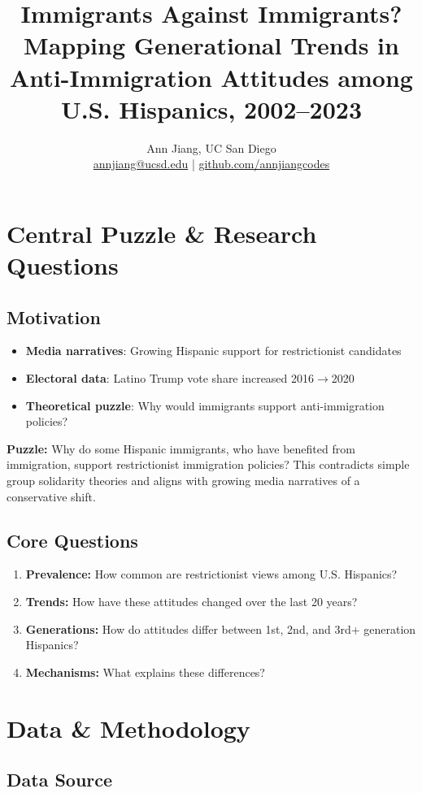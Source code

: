\documentclass[11pt,letterpaper]{article}
\title{\textbf{Immigrants Against Immigrants?}\\
\large Mapping Generational Trends in Anti-Immigration Attitudes among U.S. Hispanics, 2002--2023}
\author{Ann Jiang, UC San Diego\\
\href{mailto:annjiang@ucsd.edu}{annjiang@ucsd.edu} | \href{https://github.com/annjiangcodes}{github.com/annjiangcodes}}
\date{}
\begin{document}
\maketitle

\section{Central Puzzle \& Research Questions}

\subsection{Motivation}
\begin{itemize}
    \item \textbf{Media narratives}: Growing Hispanic support for restrictionist candidates
    \item \textbf{Electoral data}: Latino Trump vote share increased 2016$\rightarrow$2020
    \item \textbf{Theoretical puzzle}: Why would immigrants support anti-immigration policies?
\end{itemize}

\textbf{Puzzle:} Why do some Hispanic immigrants, who have benefited from immigration, support restrictionist immigration policies? This contradicts simple group solidarity theories and aligns with growing media narratives of a conservative shift.

\subsection{Core Questions}
\begin{enumerate}
    \item \textbf{Prevalence:} How common are restrictionist views among U.S. Hispanics?
    \item \textbf{Trends:} How have these attitudes changed over the last 20 years?
    \item \textbf{Generations:} How do attitudes differ between 1st, 2nd, and 3rd+ generation Hispanics?
    \item \textbf{Mechanisms:} What explains these differences?
\end{enumerate}

\section{Data \& Methodology}

\subsection{Data Source}
\end{document}
